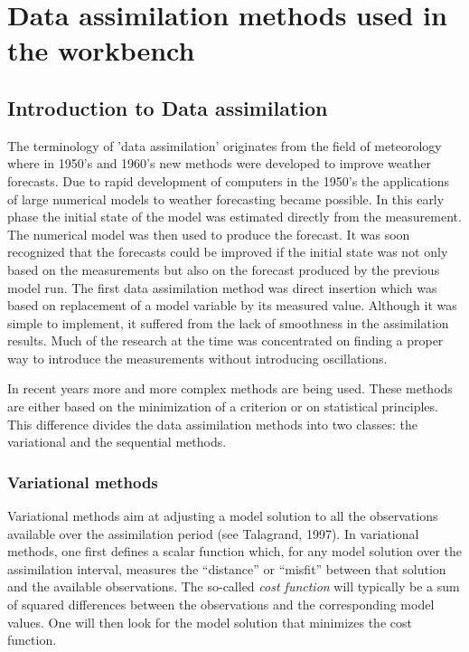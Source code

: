 \documentclass[a4paper,12pt]{article}
\begin{document}

\section{Data assimilation methods used in the workbench}


\subsection{Introduction to Data assimilation}
   The terminology of 'data assimilation' originates from the field of meteorology where in 1950's and 1960's new methods were developed to improve weather forecasts. Due to rapid development of computers in the 1950's the applications of large numerical models to weather forecasting became possible. In this early phase the initial state of the model was estimated directly from the measurement. The numerical model was then used to produce the forecast. It was soon recognized that the forecasts could be improved if the initial state was not only based on the measurements but also on the forecast produced by the previous model run. The first data assimilation method was direct insertion which was based on replacement of a model variable by its measured value. Although it was simple to implement, it suffered from the lack of smoothness in the assimilation results. Much of the research at the time was concentrated on finding a proper way to introduce the measurements without introducing oscillations.

   In recent years more and more complex methods are being used. These methods are either based on the minimization of a criterion or on statistical principles. This difference divides the data assimilation methods into two classes: the variational and the sequential methods.

   \subsubsection{Variational methods}
      Variational methods aim at adjusting a model solution to all the observations available over the assimilation period (see Talagrand, 1997). In variational methods, one first defines a scalar function which, for any model solution over the assimilation interval, measures the ``distance'' or ``misfit'' between that solution and the available observations. The so-called \emph{cost function} will typically be a sum of squared differences between the observations and the corresponding model values. One will then look for the model solution that minimizes the cost function.
\end{document}
